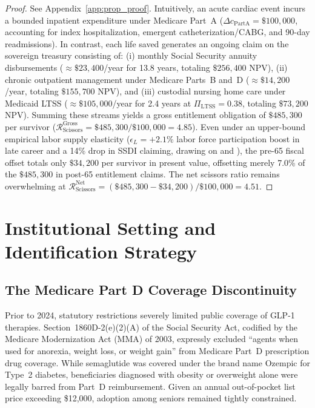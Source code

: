 \documentclass[11pt,a4paper]{article}
\begin{document}
\begin{proof}
See Appendix~\ref{app:prop_proof}. Intuitively, an acute cardiac event incurs a bounded inpatient expenditure under Medicare Part~A ($\Delta c_{\text{PartA}} = \$100,000$, accounting for index hospitalization, emergent catheterization/CABG, and 90-day readmissions). In contrast, each life saved generates an ongoing claim on the sovereign treasury consisting of: (i) monthly Social Security annuity disbursements ($\approx \$23,400$/year for 13.8 years, totaling $\$256,400$ NPV), (ii) chronic outpatient management under Medicare Parts~B and~D ($\approx \$14,200$/year, totaling $\$155,700$ NPV), and (iii) custodial nursing home care under Medicaid LTSS ($\approx \$105,000$/year for 2.4 years at $\Pi_{\text{LTSS}} = 0.38$, totaling $\$73,200$ NPV). Summing these streams yields a gross entitlement obligation of $\$485,300$ per survivor ($\mathcal{R}_{\text{Scissors}}^{\text{Gross}} = \$485,300 / \$100,000 = \mathbf{4.85}$). Even under an upper-bound empirical labor supply elasticity ($\epsilon_L = +2.1\%$ labor force participation boost in late career and a 14\% drop in SSDI claiming, drawing on \citet{autor2014disability} and \citet{french2014effect}), the pre-65 fiscal offset totals only $\$34,200$ per survivor in present value, offsetting merely 7.0\% of the $\$485,300$ in post-65 entitlement claims. The net scissors ratio remains overwhelming at $\mathcal{R}_{\text{Scissors}}^{\text{Net}} = (\$485,300 - \$34,200) / \$100,000 = \mathbf{4.51}$.
\end{proof}

\section{Institutional Setting and Identification Strategy}
\label{sec:institutions}

\subsection{The Medicare Part D Coverage Discontinuity}
Prior to 2024, statutory restrictions severely limited public coverage of GLP-1 therapies. Section~1860D-2(e)(2)(A) of the Social Security Act, codified by the Medicare Modernization Act (MMA) of 2003, expressly excluded ``agents when used for anorexia, weight loss, or weight gain'' from Medicare Part~D prescription drug coverage. While semaglutide was covered under the brand name Ozempic for Type~2 diabetes, beneficiaries diagnosed with obesity or overweight alone were legally barred from Part~D reimbursement. Given an annual out-of-pocket list price exceeding \$12,000, adoption among seniors remained tightly constrained.
\end{document}
